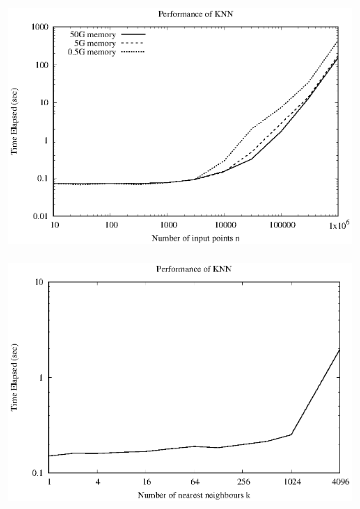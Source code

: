 \documentclass[10pt, a4paper]{article}
\begin{document}
\begin{figure}[h]
	\centering

	\begin{subfigure}{.4\textwidth}
		\centering
		\includegraphics[width=\linewidth]{knn_n}
	\end{subfigure}%
	\begin{subfigure}{.4\textwidth}
		\centering
		\includegraphics[width=\linewidth]{knn_k}
	\end{subfigure}


\end{figure}
\end{document}
